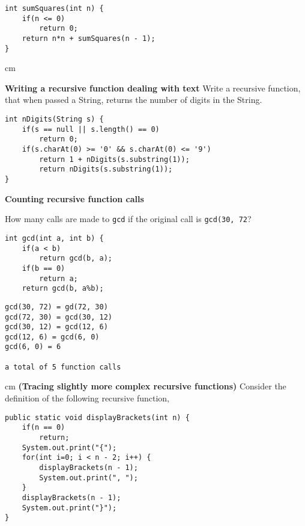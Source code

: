 \begin{questions}
\begin{solution}
\begin{lstlisting}
int sumSquares(int n) {
	if(n <= 0)
		return 0;
	return n*n + sumSquares(n - 1);
}
\end{lstlisting}	
\end{solution}

 cm

\question  \textbf{Writing a recursive function dealing with text} \vskip 0.5cm
Write a recursive function, that when passed a String, returns the number of digits in the String.

\begin{solution}
\begin{lstlisting}
int nDigits(String s) {
	if(s == null || s.length() == 0)
		return 0;
	if(s.charAt(0) >= '0' && s.charAt(0) <= '9')
		return 1 + nDigits(s.substring(1));
		return nDigits(s.substring(1));	
}
\end{lstlisting}	
\end{solution}

\question  \textbf{Counting recursive function calls} \vskip 0.5cm

How many calls are made to \texttt{gcd} if the original call is \texttt{gcd(30, 72}?

\begin{lstlisting}
int gcd(int a, int b) {
	if(a < b) 
		return gcd(b, a);
	if(b == 0)
		return a;
	return gcd(b, a%b);
\end{lstlisting}

\begin{solution}
\begin{verbatim}
gcd(30, 72) = gd(72, 30)
gcd(72, 30) = gcd(30, 12)
gcd(30, 12) = gcd(12, 6)
gcd(12, 6) = gcd(6, 0)
gcd(6, 0) = 6

a total of 5 function calls
\end{verbatim}
\end{solution}

 cm \question  \textbf{(Tracing slightly more complex recursive functions)} \vskip 0.5cm
Consider the definition of the following recursive function,

\begin{lstlisting}
public static void displayBrackets(int n) {
	if(n == 0)
		return;
	System.out.print("{");
	for(int i=0; i < n - 2; i++) {
		displayBrackets(n - 1);
		System.out.print(", ");
	}
	displayBrackets(n - 1);
	System.out.print("}");	
}
\end{lstlisting}


\end{questions}

